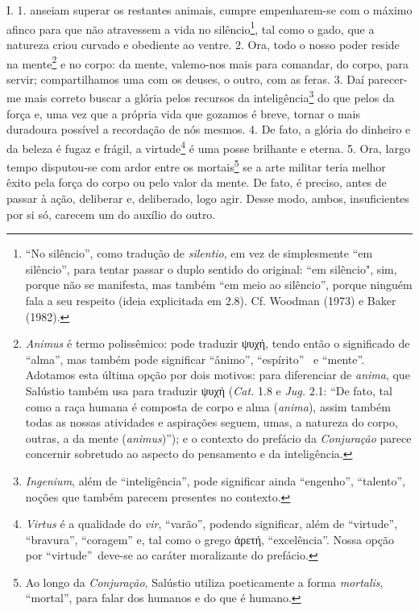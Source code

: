 \part{\titulo}


\chapter*{}

\hedramarkboth{\autor}{}

I. 1.  anseiam superar os restantes animais, cumpre
empenharem-se com o máximo afinco para que não atravessem a vida no
silêncio\footnote{``No silêncio'', como tradução de \emph{silentio}, em vez de
simplesmente ``em silêncio'', para tentar passar o duplo sentido do original:
``em silêncio", sim, porque não se manifesta, mas também ``em meio ao
silêncio'', porque ninguém fala a seu respeito (ideia explicitada em 2.8).
Cf. Woodman (1973) e Baker (1982).}, tal como o gado, que a natureza criou
curvado e obediente ao ventre. 2. Ora, todo o nosso poder reside na
mente\footnote{\emph{Animus} é termo polissêmico: pode traduzir  
\grego ψυχή, tendo então o significado de ``alma'', mas
também pode significar ``ânimo'', ``espírito'' \ e ``mente''. Adotamos esta
última opção por dois motivos: para diferenciar de  \emph{anima}, que Salústio
também usa para traduzir \grego ψυχή
 (\emph{Cat.}
1.8 e \emph{Jug.} 2.1: ``De fato, tal como a raça humana é composta de
corpo e alma (\emph{anima}), assim também todas as nossas atividades e
aspirações seguem, umas, a natureza do corpo, outras, a da mente
(\emph{animus})''); e o contexto do prefácio da \emph{Conjuração} parece
concernir sobretudo ao aspecto do pensamento e da inteligência.} 
e no corpo: da mente, valemo-nos mais para comandar, do corpo, para servir; compartilhamos uma com
os deuses, o outro, com as feras. 3. Daí parecer-me mais correto buscar a
glória pelos recursos da inteligência\footnote{\emph{Ingenium}, além de
``inteligência'', pode  significar ainda ``engenho'', ``talento'', noções que
também parecem presentes no contexto.} do que pelos da força e, uma vez que a
própria vida que gozamos é breve, tornar o mais duradoura possível a recordação
de nós mesmos. 4. De fato, a glória do dinheiro e da beleza é fugaz e frágil, a
virtude\footnote{\emph{Virtus} é a qualidade do \emph{vir}, ``varão'', podendo
significar, além de ``virtude'', ``bravura'', ``coragem'' e, tal como o grego
\grego ἀρετή, ``excelência''. Nossa opção por
``virtude''\ deve-se ao caráter moralizante do prefácio.} é uma posse brilhante
e eterna. 5. Ora, largo tempo disputou-se com ardor entre os
mortais\footnote{Ao longo da \emph{Conjuração}, Salústio utiliza poeticamente a
forma \emph{mortalis}, ``mortal'', para falar dos humanos e do que é humano.}
se a arte militar teria melhor êxito pela força do corpo ou pelo valor da
mente. De fato, é preciso, antes de passar à ação, deliberar e, deliberado,
logo agir. Desse modo, ambos, insuficientes por si só, carecem um do auxílio do
outro.

